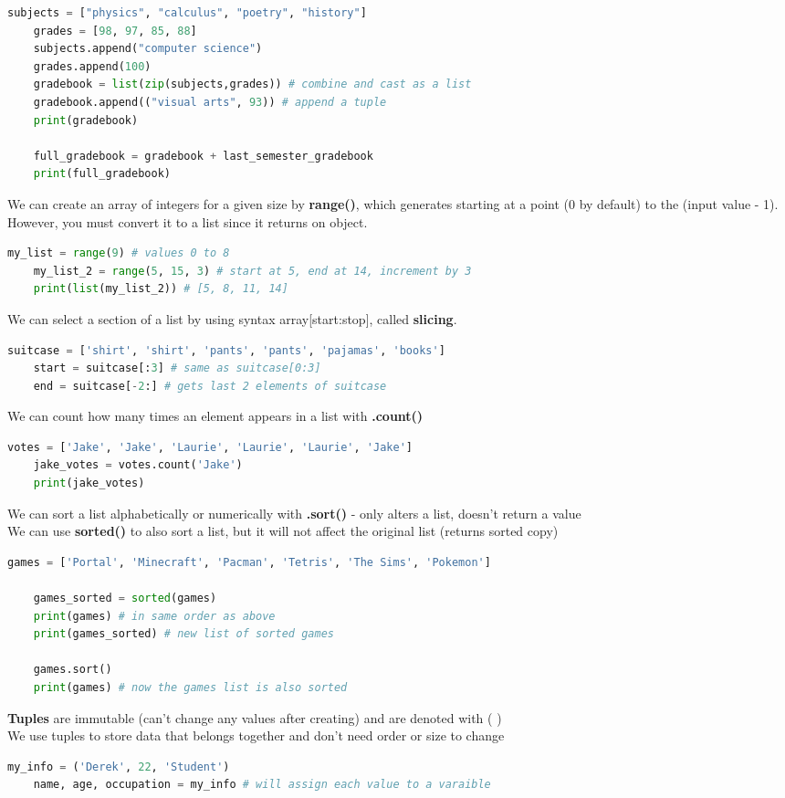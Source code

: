 \documentclass[11pt, a4paper]{article}
\begin{document}
\begin{spacing}{1.1}
\begin{lstlisting}[language=Python]
	subjects = ["physics", "calculus", "poetry", "history"]
	grades = [98, 97, 85, 88]
	subjects.append("computer science")
	grades.append(100)
	gradebook = list(zip(subjects,grades)) # combine and cast as a list
	gradebook.append(("visual arts", 93)) # append a tuple
	print(gradebook)
	
	full_gradebook = gradebook + last_semester_gradebook
	print(full_gradebook) \end{lstlisting}\vspace*{1mm}
	We can create an array of integers for a given size by \textbf{range()}, which generates starting at a point (0 by default) to the (input value - 1). However, you must convert it to a list since it returns on object.
	\begin{lstlisting}[language=Python]
	my_list = range(9) # values 0 to 8
	my_list_2 = range(5, 15, 3) # start at 5, end at 14, increment by 3
	print(list(my_list_2)) # [5, 8, 11, 14] \end{lstlisting}\vspace*{1mm}
	We can select a section of a list by using syntax array[start:stop], called \textbf{slicing}. 
	\begin{lstlisting}[language=Python]
	suitcase = ['shirt', 'shirt', 'pants', 'pants', 'pajamas', 'books']
	start = suitcase[:3] # same as suitcase[0:3]
	end = suitcase[-2:] # gets last 2 elements of suitcase \end{lstlisting}\vspace*{1mm}
	We can count how many times an element appears in a list with \textbf{.count()}
	\begin{lstlisting}[language=Python]
	votes = ['Jake', 'Jake', 'Laurie', 'Laurie', 'Laurie', 'Jake']
	jake_votes = votes.count('Jake')
	print(jake_votes) \end{lstlisting}\vspace*{1mm}
	We can sort a list alphabetically or numerically with \textbf{.sort()} - only alters a list, doesn't return a value \\
	We can use \textbf{sorted()} to also sort a list, but it will not affect the original list (returns sorted copy)
	\begin{lstlisting}[language=Python]
	games = ['Portal', 'Minecraft', 'Pacman', 'Tetris', 'The Sims', 'Pokemon']
	
	games_sorted = sorted(games)
	print(games) # in same order as above
	print(games_sorted) # new list of sorted games
	
	games.sort()
	print(games) # now the games list is also sorted \end{lstlisting}\vspace*{1mm}
	\textbf{Tuples} are immutable (can't change any values after creating) and are denoted with ( ) \\
	We use tuples to store data that belongs together and don't need order or size to change
	\begin{lstlisting}[language=Python]
	my_info = ('Derek', 22, 'Student')
	name, age, occupation = my_info # will assign each value to a varaible
	

\end{lstlisting}
\end{spacing}
\end{document}
